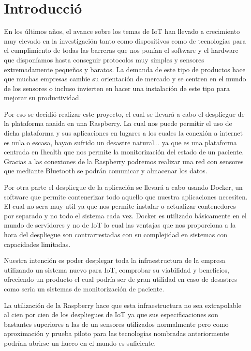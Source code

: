 \cleardoublepage
{}
\chapter*{Introducció}
En los últimos años, el avance sobre los temas de IoT han llevado a crecimiento muy elevado en la investigación tanto como dispositivos como de tecnologías para el cumplimiento de todas las barreras que nos ponían el software y el hardware que disponíamos hasta conseguir protocolos muy simples y sensores extremadamente pequeños y baratos. La demanda de este tipo de productos hace que muchas empresas cambie su orientación de mercado y se centren en el mundo de los sensores o incluso invierten en hacer una instalación de este tipo para mejorar su productividad. 

Por eso se decidió realizar este proyecto, el cual se llevará a cabo el despliegue de la plataforma aaaida en una Raspberry. La cual nos puede permitir el uso de dicha plataforma y sus aplicaciones en lugares a los cuales la conexión a internet es nula o escasa, hayan sufrido un desastre natural... ya que es una plataforma centrada en Ihealth que nos permite la monitorización del estado de un paciente.
Gracias a las conexiones de la Raspberry podremos realizar una red con sensores que mediante Bluetooth se podrán comunicar y almacenar los datos. 

Por otra parte el despliegue de la aplicación se llevará a cabo usando Docker, un software que permite contenerizar todo aquello que nuestra aplicaciones necesiten. El cual no sera muy util ya que nos permite instalar o actualizar contenedores por separado y no todo el sistema cada vez. Docker es utilizado básicamente en el mundo de servidores y no de IoT lo cual las ventajas que nos proporciona a la hora del despliegue son contrarrestadas con su complejidad en sistemas con capacidades limitadas.

Nuestra intención es poder desplegar toda la infraestructura de la empresa utilizando un sistema nuevo para IoT, comprobar su viabilidad y beneficios, ofreciendo un producto el cual podría ser de gran utilidad en caso de desastres como seria un sistemas de monitorización de paciente. 

La utilización de la Raspberry hace que esta infraestructura no sea extrapolable al cien por cien de los despliegues de IoT ya que sus especificaciones son bastantes superiores a las de un sensores utilizados normalmente pero como aproximación y prueba piloto para  las tecnologías nombradas anteriormente podrían abrirse un hueco en el mundo es suficiente. 
